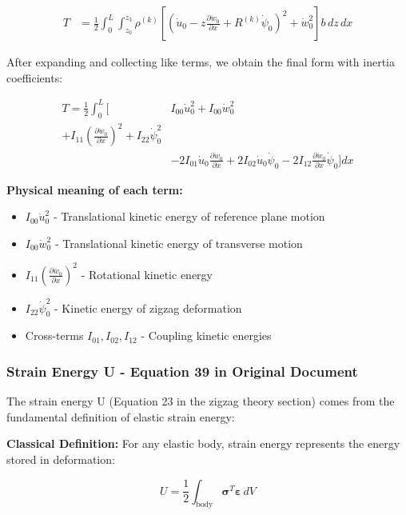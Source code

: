 \documentclass[12pt,a4paper]{article}
\begin{document}
\begin{align}
T &= \frac{1}{2} \int_0^L \int_{z_0}^{z_3} \rho^{(k)} \left[ \left(\dot{u}_0 - z\frac{\partial \dot{w}_0}{\partial x} + R^{(k)}\dot{\psi}_0\right)^2 + \dot{w}_0^2 \right] b \, dz \, dx
\end{align}

After expanding and collecting like terms, we obtain the final form with inertia coefficients:

\begin{align}
T = \frac{1}{2} \int_0^L \Big[ & I_{00}\dot{u}_0^2 + I_{00}\dot{w}_0^2 \\
+ I_{11}\left(\frac{\partial \dot{w}_0}{\partial x}\right)^2 + I_{22}\dot{\psi}_0^2 \nonumber \\
& - 2I_{01}\dot{u}_0\frac{\partial \dot{w}_0}{\partial x}
+ 2I_{02}\dot{u}_0\dot{\psi}_0
- 2I_{12}\frac{\partial \dot{w}_0}{\partial x}\dot{\psi}_0 \Big] dx
\end{align}

\textbf{Physical meaning of each term:}
\begin{itemize}
\item $I_{00}\dot{u}_0^2$ - Translational kinetic energy of reference plane motion
\item $I_{00}\dot{w}_0^2$ - Translational kinetic energy of transverse motion
\item $I_{11}(\frac{\partial \dot{w}_0}{\partial x})^2$ - Rotational kinetic energy
\item $I_{22}\dot{\psi}_0^2$ - Kinetic energy of zigzag deformation
\item Cross-terms $I_{01}, I_{02}, I_{12}$ - Coupling kinetic energies
\end{itemize}

\subsubsection{Strain Energy U - Equation 39 in Original Document}

The strain energy U (Equation 23 in the zigzag theory section) comes from the fundamental definition of elastic strain energy:

\textbf{Classical Definition:} For any elastic body, strain energy represents the energy stored in deformation:

\begin{equation}
U = \frac{1}{2} \int_{\text{body}} \boldsymbol{\sigma}^T \boldsymbol{\varepsilon} \, dV
\end{equation}
\end{document}
